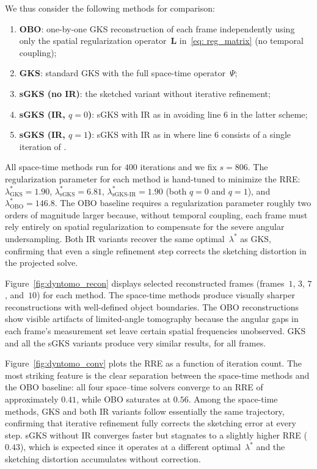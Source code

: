 \documentclass[%
  a4paper,
  onecolumn,
  colorlinks,
]{preprint}
\theoremstyle{plain}
\theoremstyle{definition}
\newcommand{\bL}{\ensuremath{\boldsymbol{L}}}
\begin{document}
We thus consider the following methods for comparison:
\begin{enumerate}
  \item [$\diamond$] \textbf{OBO}: one-by-one GKS reconstruction of each frame
        independently using only the spatial regularization
        operator~$\bL$ in~\eqref{eq: reg_matrix} (no temporal coupling);
  \item [$\diamond$] \textbf{GKS}: standard GKS with the full space-time
        operator~$\Psi$;
  \item [$\diamond$] \textbf{sGKS (no IR)}: the sketched variant without
        iterative refinement;
  \item [$\diamond$] \textbf{sGKS (IR, $q=0$)}: sGKS with IR as in \cite[Algorithm 1]{Iterative_refinement_sketching} avoiding line 6 in the latter scheme;
  \item [$\diamond$] \textbf{sGKS (IR, $q=1$)}: sGKS with IR as in \cite[Algorithm 1]{Iterative_refinement_sketching} where line 6 consists of a single iteration of  \cite[Algorithm 2]{Iterative_refinement_sketching}.
\end{enumerate}
All space-time methods run for $400$ iterations and we fix $s= 806$.
The regularization parameter for each method is hand-tuned to minimize
the RRE: $\lambda^*_{\mathrm{GKS}} = 1.90$,
$\lambda^*_{\text{sGKS}} = 6.81$,
$\lambda^*_{\text{sGKS-IR}} = 1.90$ (both $q = 0$ and $q = 1$),
and $\lambda^*_{\mathrm{OBO}} = 146.8$.
The OBO baseline requires a regularization parameter roughly two
orders of magnitude larger because, without temporal coupling, each
frame must rely entirely on spatial regularization to compensate for
the severe angular undersampling.
Both IR variants recover the same optimal~$\lambda^*$ as GKS,
confirming that even a single refinement step corrects the sketching
distortion in the projected solve.

Figure~\ref{fig:dyntomo_recon} displays selected reconstructed frames
(frames~$1$, $3$, $7$, and~$10$) for each method.
The space-time methods produce visually sharper reconstructions with
well-defined object boundaries.
The OBO reconstructions show visible artifacts of limited-angle tomography because the angular gaps in each
frame's measurement set leave certain spatial frequencies unobserved. GKS and all the sGKS variants produce very similar results, for all frames.

Figure~\ref{fig:dyntomo_conv} plots the RRE as a function of
iteration count.
The most striking feature is the clear separation between the
space-time methods and the OBO baseline: all four space--time solvers
converge to an RRE of approximately $0.41$, while OBO saturates
at $0.56$.
Among the space-time methods, GKS and both IR variants
follow essentially the same trajectory, confirming that iterative
refinement fully corrects the sketching error at every step.
sGKS without IR converges faster but stagnates to a slightly higher RRE ($0.43$), which
is expected since it operates at a different optimal~$\lambda^*$ and
the sketching distortion accumulates without correction.
\end{document}
